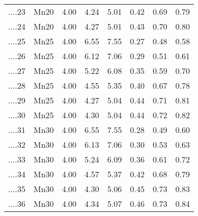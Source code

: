 \begin{table}[ht]
\begin{tabular}{rlrrrrrr}
  ....23 & Mn20 & 4.00 & 4.24 & 5.01 & 0.42 & 0.69 & 0.79 \\ 
  ....24 & Mn20 & 4.00 & 4.27 & 5.01 & 0.43 & 0.70 & 0.80 \\ 
  ....25 & Mn25 & 4.00 & 6.55 & 7.55 & 0.27 & 0.48 & 0.58 \\ 
  ....26 & Mn25 & 4.00 & 6.12 & 7.06 & 0.29 & 0.51 & 0.61 \\ 
  ....27 & Mn25 & 4.00 & 5.22 & 6.08 & 0.35 & 0.59 & 0.70 \\ 
  ....28 & Mn25 & 4.00 & 4.55 & 5.35 & 0.40 & 0.67 & 0.78 \\ 
  ....29 & Mn25 & 4.00 & 4.27 & 5.04 & 0.44 & 0.71 & 0.81 \\ 
  ....30 & Mn25 & 4.00 & 4.30 & 5.04 & 0.44 & 0.72 & 0.82 \\ 
  ....31 & Mn30 & 4.00 & 6.55 & 7.55 & 0.28 & 0.49 & 0.60 \\ 
  ....32 & Mn30 & 4.00 & 6.13 & 7.06 & 0.30 & 0.53 & 0.63 \\ 
  ....33 & Mn30 & 4.00 & 5.24 & 6.09 & 0.36 & 0.61 & 0.72 \\ 
  ....34 & Mn30 & 4.00 & 4.57 & 5.37 & 0.42 & 0.68 & 0.79 \\ 
  ....35 & Mn30 & 4.00 & 4.30 & 5.06 & 0.45 & 0.73 & 0.83 \\ 
  ....36 & Mn30 & 4.00 & 4.34 & 5.07 & 0.46 & 0.73 & 0.84 \\ 
   \hline
\end{tabular}
\end{table}
